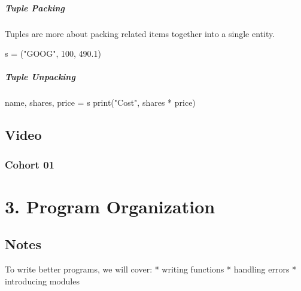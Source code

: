 \documentclass[
  letterpaper,
  DIV=11,
  numbers=noendperiod]{scrreprt}
\newenvironment{Shaded}{\begin{snugshade}}{\end{snugshade}}
\newcommand{\BuiltInTok}[1]{\textcolor[rgb]{0.00,0.46,0.62}{#1}}
\newcommand{\DecValTok}[1]{\textcolor[rgb]{0.68,0.00,0.00}{#1}}
\newcommand{\FloatTok}[1]{\textcolor[rgb]{0.68,0.00,0.00}{#1}}
\newcommand{\NormalTok}[1]{\textcolor[rgb]{0.00,0.46,0.62}{#1}}
\newcommand{\OperatorTok}[1]{\textcolor[rgb]{0.37,0.37,0.37}{#1}}
\newcommand{\StringTok}[1]{\textcolor[rgb]{0.13,0.47,0.30}{#1}}
\begin{document}
\hypertarget{tuple-packing}{%
\subsubsection{Tuple Packing}\label{tuple-packing}}

Tuples are more about packing related items together into a single
entity.

\begin{Shaded}
\begin{Highlighting}[]
\NormalTok{s }\OperatorTok{=}\NormalTok{ (}\StringTok{"GOOG"}\NormalTok{, }\DecValTok{100}\NormalTok{, }\FloatTok{490.1}\NormalTok{)}
\end{Highlighting}
\end{Shaded}

\hypertarget{tuple-unpacking}{%
\subsubsection{Tuple Unpacking}\label{tuple-unpacking}}

\begin{Shaded}
\begin{Highlighting}[]
\NormalTok{name, shares, price }\OperatorTok{=}\NormalTok{ s}
\BuiltInTok{print}\NormalTok{(}\StringTok{"Cost"}\NormalTok{, shares }\OperatorTok{*}\NormalTok{ price)}
\end{Highlighting}
\end{Shaded}

\hypertarget{video-1}{%
\chapter{Video}\label{video-1}}

\hypertarget{cohort-01-1}{%
\section{Cohort 01}\label{cohort-01-1}}

\part{3. Program Organization}

\hypertarget{notes-2}{%
\chapter{Notes}\label{notes-2}}

To write better programs, we will cover: * writing functions * handling
errors * introducing modules
\end{document}
